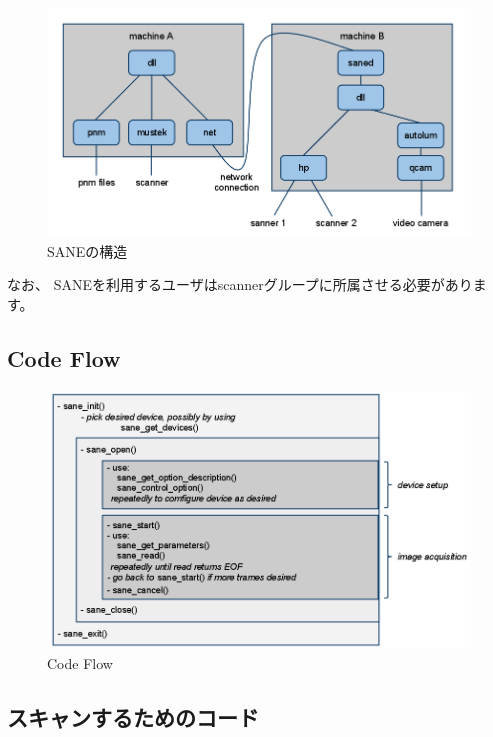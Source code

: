 \documentclass[mingoth,a4paper]{jsarticle}
\begin{document}
\begin{figure}[H]
\begin{center}
 \includegraphics[height=0.5\hsize] {image201012/libsane02.png}
 \caption{SANEの構造}
\label{fig:sane}
\end{center}
\end{figure}

なお、
SANEを利用するユーザはscannerグループに所属させる必要があります。

\subsection{Code Flow}

\begin{figure}[H]
\begin{center}
 \includegraphics[height=0.5\hsize] {image201012/codeflow.png}
 \caption{Code Flow}
\label{fig:codeflow}
\end{center}
\end{figure}


\subsection{スキャンするためのコード}
\end{document}
